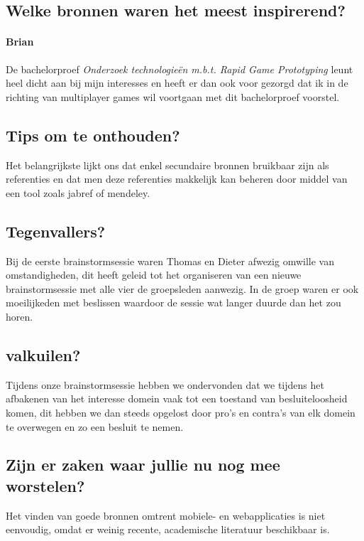 \documentclass[fleqn,10pt]{voorstel}
\begin{document}

\subsection{Welke bronnen waren het meest inspirerend?}



\paragraph{Brian}De bachelorproef \textit{Onderzoek technologieën m.b.t. Rapid Game Prototyping} \citep{Timmerman2013} leunt heel dicht aan bij mijn interesses en heeft er dan ook voor gezorgd dat ik in de richting van multiplayer games wil voortgaan met dit bachelorproef voorstel.


\subsection{Tips om te onthouden?}
Het belangrijkste lijkt ons dat enkel secundaire bronnen bruikbaar zijn als referenties en dat men deze referenties makkelijk kan beheren door middel van een tool zoals jabref of mendeley.

\subsection{Tegenvallers?}
Bij de eerste brainstormsessie waren Thomas en Dieter afwezig omwille van omstandigheden, dit heeft geleid tot het organiseren van een nieuwe brainstormsessie met alle vier de groepsleden aanwezig. In de groep waren er ook
moeilijkeden met beslissen waardoor de sessie wat langer duurde dan het zou horen.

\subsection{valkuilen?}
Tijdens onze brainstormsessie hebben we ondervonden dat we tijdens het afbakenen van het interesse domein vaak tot een toestand van besluiteloosheid komen, dit hebben we dan steeds opgelost door pro's en contra's van elk domein te overwegen en zo een besluit te nemen. 

\subsection{Zijn er zaken waar jullie nu nog mee worstelen?}
Het vinden van goede bronnen omtrent mobiele- en webapplicaties is niet eenvoudig, omdat er weinig recente, academische literatuur beschikbaar is. 
\end{document}
